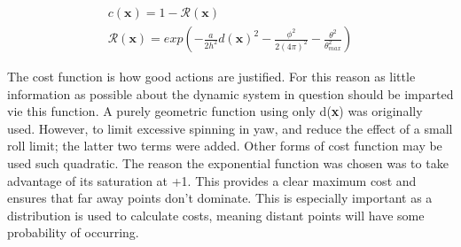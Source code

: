 \documentclass[twoside,twocolumn,12pt]{article}
\begin{document}
\begin{equation}
\label{eq:simple}
\begin{gathered}
c(\textbf{x}) = 1 - \mathcal{R}(\textbf{x}) \\ 
\mathcal{R}(\textbf{x}) = exp(-\frac{a}{2h^2}d(\textbf{x})^2 - \frac{\phi^2}{2(4\pi)^2} - \frac{\theta^2}{\theta_{max}^2}) 
\end{gathered} 
\end{equation}

The cost function is how good actions are justified. For this reason as little information as possible about the dynamic system in question should be imparted vie this function. A purely geometric function using only d(\textbf{x}) was originally used. However, to limit excessive spinning in yaw, and reduce the effect of a small roll limit; the latter two terms were added.
\newline
Other forms of cost function may be used such  quadratic. The reason the exponential function was chosen was to take advantage of its saturation at +1. This provides a clear maximum cost and ensures that far away points don't dominate. This is especially important as a distribution is used to calculate costs, meaning distant points will have some probability of occurring. 
\end{document}

